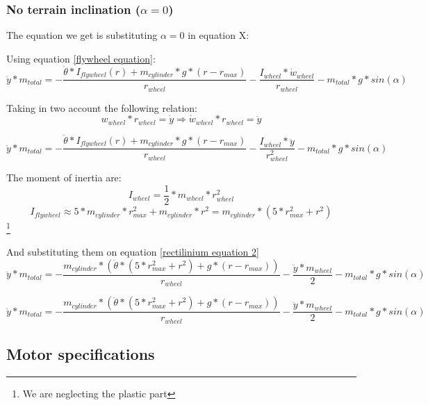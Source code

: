 \subsubsection{No terrain inclination ($\alpha = 0$)}
The equation we get is substituting $\alpha = 0$ in equation X:




Using equation \ref{flywheel equation}:
\begin{equation}\label{rectilinium equation}
    \ddot{y}*m_{total} = - \frac{\ddot{\theta}*I_{flywheel}(r) + m_{cylinder} * g * (r - r_{max})}{r_{wheel}} - \frac{I_{wheel} * \dot{w}_{wheel}}{r_{wheel}} - m_{total} * g * sin(\alpha)  
\end{equation}

Taking in two account the following relation:
\[w_{wheel} * r_{wheel} = \dot{y} \Rightarrow  \dot{w}_{wheel} * r_{wheel} = \ddot{y} \]


\begin{equation}\label{rectilinium equation 2}
    \ddot{y}*m_{total} = - \frac{\ddot{\theta}*I_{flywheel}(r) + m_{cylinder} * g * (r - r_{max})}{r_{wheel}} - \frac{I_{wheel} * \ddot{y}}{r_{wheel}^2} - m_{total} * g * sin(\alpha)  
\end{equation}

The moment of inertia are:
\[I_{wheel} = \frac{1}{2} *m_{wheel} * r_{wheel}^2\]
\[I_{flywheel} \approx 5 * m_{cylinder} * r_{max}^2 + m_{cylinder} * r^2 = m_{cylinder} * (5*r_{max}^2 + r^2)\] \footnote{We are neglecting the plastic part}


And substituting them on equation \ref{rectilinium equation 2}
\begin{equation}\label{rectilinium equation 3}
    \ddot{y}*m_{total} = - \frac{m_{cylinder}*(\ddot{\theta}*(5*r_{max}^2 + r^2) + g*(r - r_{max}))}{r_{wheel}} - \frac{\ddot{y}*m_{wheel}}{2} - m_{total}*g*sin(\alpha)  
\end{equation}

\begin{equation}\label{rectilinium equation 4}
    \ddot{y}*m_{total} = - \frac{m_{cylinder}*(\ddot{\theta}*(5*r_{max}^2 + r^2) + g*(r - r_{max}))}{r_{wheel}} - \frac{\ddot{y}*m_{wheel}}{2} - m_{total}*g*sin(\alpha)  
\end{equation}

\subsection{Motor specifications}

